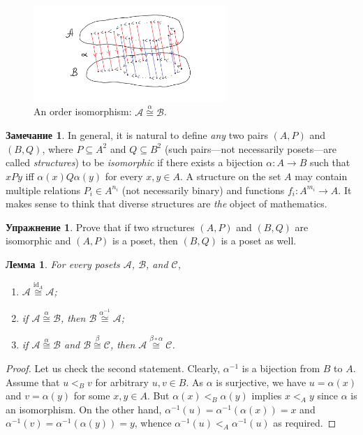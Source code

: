 \documentclass[12pt,notitlepage]{article}
\theoremstyle{plain}
\newtheorem{lemma}[thm]{Лемма}
\theoremstyle{definition}
\newtheorem{exc}[thm]{Упражнение}
\newtheorem{rem}[thm]{Замечание}
\theoremstyle{plain}
\newcommand{\sbs}{\subseteq}
\newcommand{\id}{\mathrm{id}}
\newcommand{\1}{\mathbf{1}}
\newcommand{\0}{\mathbf{0}}
\begin{document}
\begin{figure}[h]
	\centering
	\includegraphics*[width=0.65\textwidth]{ord_iso.pdf}
	\caption{An order isomorphism: $\mathcal A \stackrel{\alpha}{\cong} \mathcal B$.}
\end{figure}

\begin{rem}
	In general, it is natural to define \emph{any} two pairs $(A, P)$ and $(B, Q)$, where $P \sbs A^2$ and $Q \sbs B^2$ (such pairs---not necessarily posets---are called \emph{structures}) to be \emph{isomorphic} if there exists a bijection $\alpha\colon A \to B$ such that $x P y$ iff $\alpha(x) Q \alpha(y)$ for every $x, y \in A$. A structure on the set $A$ may contain multiple relations $P_i \in A^{n_i}$ (not necessarily binary) and functions $f_i \colon A^{m_i} \to A$. It makes sense to think that diverse structures are \emph{the} object of mathematics.
\end{rem}
\begin{exc}
	Prove that if two structures $(A, P)$ and $(B, Q)$ are isomorphic and $(A, P)$ is a poset, then $(B, Q)$ is a poset as well.
\end{exc}

\begin{lemma}
	For every posets  $\mathcal A$, $\mathcal B$, and $\mathcal C$,
	\begin{enumerate}
		\item $\mathcal A \stackrel{\id_A}{\cong}  \mathcal A$;
		\item if $\mathcal A \stackrel{\alpha}{\cong}  \mathcal B$, then $\mathcal B \stackrel{\alpha^{-1}}{\cong}  \mathcal A$;
		\item if $\mathcal A \stackrel{\alpha}{\cong}  \mathcal B$ and $\mathcal B \stackrel{\beta}{\cong}  \mathcal C$, then $\mathcal A \stackrel{\beta \circ \alpha}{\cong} \mathcal C$.
	\end{enumerate}
\end{lemma}
\begin{proof}
	Let us check the second statement. Clearly, $\alpha^{-1}$ is a bijection from $B$ to $A$. Assume that $u <_B v$ for arbitrary $u, v \in B$. As $\alpha$ is surjective, we have $u = \alpha(x)$ and $v = \alpha(y)$ for some $x, y \in A$. But $\alpha(x) <_B \alpha(y)$ implies $x <_A y$ since $\alpha$ is an isomorphism. On the other hand, $\alpha^{-1}(u) = \alpha^{-1}(\alpha(x)) = x$ and $\alpha^{-1}(v) = \alpha^{-1}(\alpha(y)) = y$, whence $\alpha^{-1}(u) <_A \alpha^{-1}(u)$ as required.
\end{proof}
\end{document}
